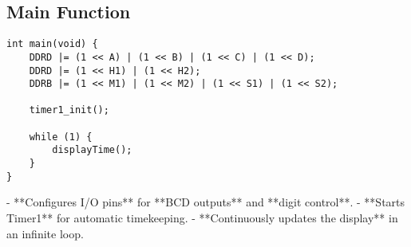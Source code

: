 \subsection*{Main Function}
\begin{lstlisting}
int main(void) {
    DDRD |= (1 << A) | (1 << B) | (1 << C) | (1 << D);
    DDRD |= (1 << H1) | (1 << H2);
    DDRB |= (1 << M1) | (1 << M2) | (1 << S1) | (1 << S2);
    
    timer1_init();

    while (1) {
        displayTime();
    }
}
\end{lstlisting}
- **Configures I/O pins** for **BCD outputs** and **digit control**.
- **Starts Timer1** for automatic timekeeping.
- **Continuously updates the display** in an infinite loop.
